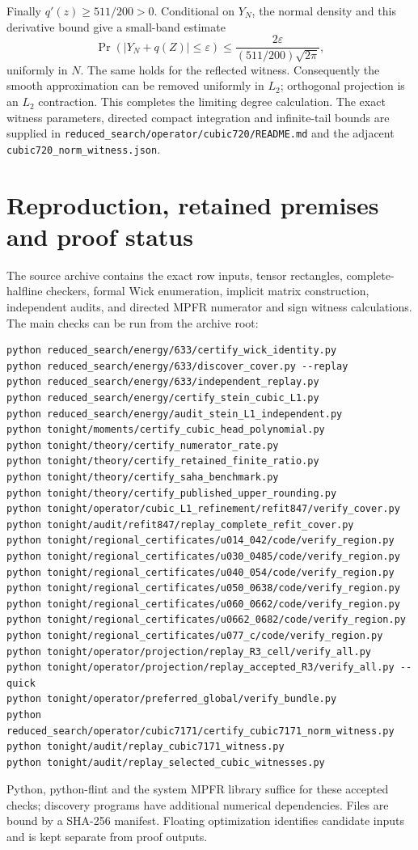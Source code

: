 \documentclass[11pt]{article}
\begin{document}
Finally $q'(z)\ge511/200>0$. Conditional on $Y_N$, the normal density
and this derivative bound give a small-band estimate
\[
 \Pr(|Y_N+q(Z)|\le\varepsilon)
 \le\frac{2\varepsilon}{(511/200)\sqrt{2\pi}},
\]
uniformly in $N$. The same holds for the reflected witness.
Consequently the smooth approximation can be removed uniformly in
$L_2$; orthogonal projection is an $L_2$ contraction. This completes
the limiting degree calculation. The exact witness parameters,
directed compact integration and infinite-tail bounds are supplied in
\texttt{reduced\_search/operator/cubic720/README.md} and the adjacent
\texttt{cubic720\_norm\_witness.json}.

\section{Reproduction, retained premises and proof status}\label{app:status}
The source archive contains the exact row inputs, tensor rectangles,
complete-halfline checkers, formal Wick enumeration, implicit matrix
construction, independent audits, and directed MPFR numerator and sign
witness calculations. The main checks can be run from the archive root:
\begin{verbatim}
python reduced_search/energy/633/certify_wick_identity.py
python reduced_search/energy/633/discover_cover.py --replay
python reduced_search/energy/633/independent_replay.py
python reduced_search/energy/certify_stein_cubic_L1.py
python reduced_search/energy/audit_stein_L1_independent.py
python tonight/moments/certify_cubic_head_polynomial.py
python tonight/theory/certify_numerator_rate.py
python tonight/theory/certify_retained_finite_ratio.py
python tonight/theory/certify_saha_benchmark.py
python tonight/theory/certify_published_upper_rounding.py
python tonight/operator/cubic_L1_refinement/refit847/verify_cover.py
python tonight/audit/refit847/replay_complete_refit_cover.py
python tonight/regional_certificates/u014_042/code/verify_region.py
python tonight/regional_certificates/u030_0485/code/verify_region.py
python tonight/regional_certificates/u040_054/code/verify_region.py
python tonight/regional_certificates/u050_0638/code/verify_region.py
python tonight/regional_certificates/u060_0662/code/verify_region.py
python tonight/regional_certificates/u0662_0682/code/verify_region.py
python tonight/regional_certificates/u077_c/code/verify_region.py
python tonight/operator/projection/replay_R3_cell/verify_all.py
python tonight/operator/projection/replay_accepted_R3/verify_all.py --quick
python tonight/operator/preferred_global/verify_bundle.py
python reduced_search/operator/cubic7171/certify_cubic7171_norm_witness.py
python tonight/audit/replay_cubic7171_witness.py
python tonight/audit/replay_selected_cubic_witnesses.py
\end{verbatim}
Python, python-flint and the system MPFR library suffice for these accepted
checks; discovery programs have additional numerical dependencies.
Files are bound by a SHA-256 manifest. Floating optimization identifies
candidate inputs and is kept separate from proof outputs.
\end{document}
